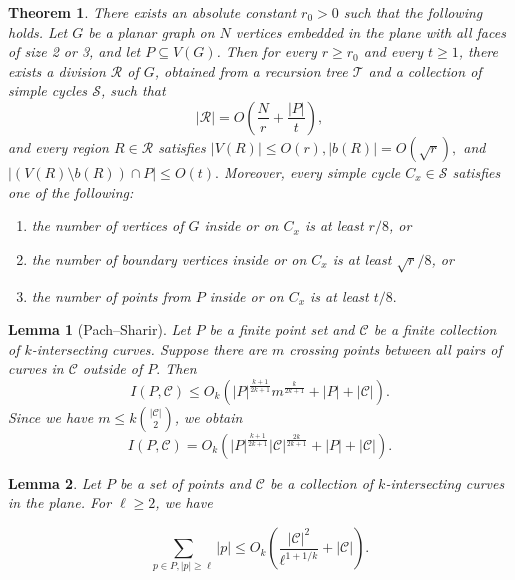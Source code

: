 \documentclass[10pt,a4paper]{amsart}
\newtheorem{theorem}{Theorem}
\newtheorem{lemma}{Lemma}
\begin{document}
\begin{theorem}\label{rdiv}
There exists an absolute constant $r_0>0$ such that the following holds. Let $G$ be a planar graph on $N$ vertices embedded in the plane with all faces of size 2 or 3, and let $P \subseteq V(G)$.  Then for every $r \ge r_0$ and every $t \ge 1$, there exists a division $\mathcal R$ of $G$, obtained from a recursion tree $\mathcal T$ and a collection of simple cycles $\mathcal S$, such that
\[
|\mathcal{R}| = O\!\left(\frac{N}{r} + \frac{|P|}{t}\right),
\]
and every region $R \in \mathcal{R}$ satisfies $|V(R)| \le O(r),
|b(R)| = O(\sqrt r),$ and $|(V(R)\setminus b(R))\cap P| \le O(t).$  Moreover, every simple cycle $C_x \in \mathcal{S}$ satisfies one of the following: 


\begin{enumerate}
     
    \item the number of vertices of $G$ inside or on $C_x$ is at least $r/8$, or

    \item the number of boundary vertices inside or on $C_x$ is at least $\sqrt{r}/8$, or

    \item the number of points from $P$ inside or on $C_x$ is at least $t/8.$
 \end{enumerate}
\end{theorem}

\begin{lemma}[Pach--Sharir]\label{PSlemma}
Let \(P\) be a finite point set and $\mathcal C$ be a finite collection of $k$-intersecting curves.  Suppose there are $m$ crossing points between all pairs of curves in $\mathcal C$ outside of $P.$
Then
\[
I(P,\mathcal C)
\le
O_k\left(
|P|^{\frac{k + 1}{2k + 1}}
m^{\frac{k}{2k + 1}}
+|P|+|\mathcal  C|
\right).
\]
Since we have $m \leq k\binom{|\mathcal C|}{2}$, we obtain
\[
I(P,\mathcal{C}) = O_k\left(
|P|^{\frac{k + 1}{2k + 1}}
|\mathcal C|^{\frac{2k}{2k + 1}}
+|P|+|\mathcal  C|
\right).
\]  


\end{lemma}

\begin{lemma}\label{smalldeg}
Let $P$ be a set of points and $\mathcal C$ be a collection of $k$-intersecting curves in the plane. For $\ell \ge 2$,  we have


$$\sum\limits_{p\in P, |p| \geq \ell}|p| \leq  O_k\!\left(
\frac{|\mathcal C|^2}{\ell^{1+1/k}}
+
|\mathcal C|
\right).$$



 
\end{lemma}
\end{document}
